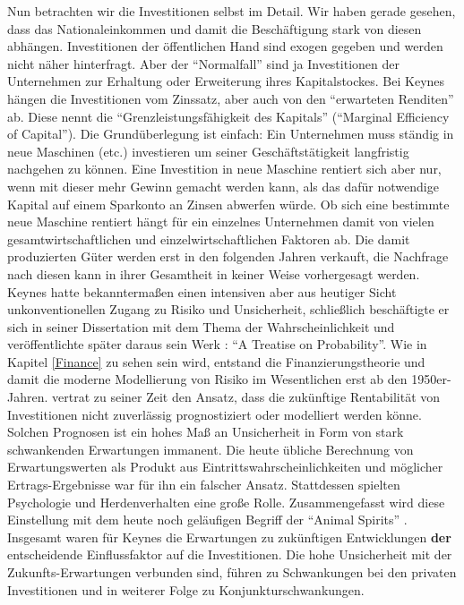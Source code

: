 Nun betrachten wir die Investitionen selbst im Detail. Wir haben gerade gesehen, dass das Nationaleinkommen und damit die Beschäftigung stark von diesen abhängen. Investitionen der öffentlichen Hand sind exogen gegeben und werden nicht näher hinterfragt. Aber der "`Normalfall"' sind ja Investitionen der Unternehmen zur Erhaltung oder Erweiterung ihres Kapitalstockes. Bei Keynes hängen die Investitionen vom Zinssatz, aber auch von den "`erwarteten Renditen"' ab. Diese nennt \textcite[S. 135]{Keynes1936} die "`Grenzleistungsfähigkeit des Kapitals"' ("`Marginal Efficiency of Capital"'). Die Grundüberlegung ist einfach: Ein Unternehmen muss ständig in neue Maschinen (etc.) investieren um seiner Geschäftstätigkeit langfristig nachgehen zu können. Eine Investition in neue Maschine rentiert sich aber nur, wenn mit dieser mehr Gewinn gemacht werden kann, als das dafür notwendige Kapital auf einem Sparkonto an Zinsen abwerfen würde. Ob sich eine bestimmte neue Maschine rentiert hängt für ein einzelnes Unternehmen damit von vielen gesamtwirtschaftlichen und einzelwirtschaftlichen Faktoren ab. Die damit produzierten Güter werden erst in den folgenden Jahren verkauft, die Nachfrage nach diesen kann in ihrer Gesamtheit in keiner Weise vorhergesagt werden. Keynes hatte bekanntermaßen einen intensiven aber aus heutiger Sicht unkonventionellen Zugang zu Risiko und Unsicherheit, schließlich beschäftigte er sich in seiner Dissertation mit dem Thema der Wahrscheinlichkeit und veröffentlichte später daraus sein Werk \textcite{Keynes1921}: "`A Treatise on Probability"'. Wie in Kapitel \ref{Finance} zu sehen sein wird, entstand die Finanzierungstheorie und damit die moderne Modellierung von Risiko im Wesentlichen erst ab den 1950er-Jahren. \textcite{Keynes1936} vertrat zu seiner Zeit den Ansatz, dass die zukünftige Rentabilität von Investitionen nicht zuverlässig prognostiziert oder modelliert werden könne. Solchen Prognosen ist ein hohes Maß an Unsicherheit in Form von stark schwankenden Erwartungen immanent. Die heute übliche Berechnung von Erwartungswerten als Produkt aus Eintrittswahrscheinlichkeiten und möglicher Ertrags-Ergebnisse war für ihn ein falscher Ansatz. Stattdessen spielten Psychologie und Herdenverhalten eine große Rolle. Zusammengefasst wird diese Einstellung mit dem heute noch geläufigen Begriff der "`Animal Spirits"' \parencite[S. 161f]{Keynes1936}. Insgesamt waren für Keynes die Erwartungen zu zukünftigen Entwicklungen \textbf{der} entscheidende Einflussfaktor auf die Investitionen. Die hohe Unsicherheit mit der Zukunfts-Erwartungen verbunden sind, führen zu Schwankungen bei den privaten Investitionen und in weiterer Folge zu Konjunkturschwankungen. 

